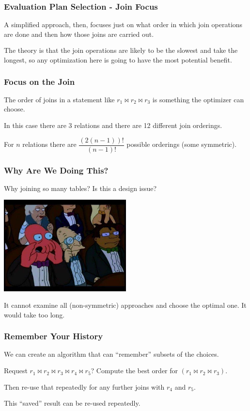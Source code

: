 \begin{frame}
\frametitle{Evaluation Plan Selection - Join Focus}

A simplified approach, then, focuses just on what order in which join operations are done and then how those joins are carried out. 

The theory is that the join operations are likely to be the slowest and take the longest, so any optimization here is going to have the most potential benefit.


\end{frame}

\begin{frame}
\frametitle{Focus on the Join}

The order of joins in a statement like $r_{1} \bowtie r_{2} \bowtie r_{3}$ is something the optimizer can choose. 

In this case there are 3 relations and there are 12 different join orderings. 

For $n$ relations there are $\dfrac{(2(n-1))!}{(n-1)!}$ possible orderings (some symmetric).


\end{frame}


\begin{frame}
\frametitle{Why Are We Doing This?}

Why joining so many tables? Is this a design issue?

\begin{center}
	\includegraphics[width=0.5\textwidth]{images/zoidberg.jpg}
\end{center}


It cannot examine all (non-symmetric) approaches and choose the optimal one. It would take too long.

\end{frame}


\begin{frame}
\frametitle{Remember Your History}

We can create an algorithm that can ``remember'' subsets of the choices. 

Request  $r_{1} \bowtie r_{2} \bowtie r_{3} \bowtie r_{4} \bowtie r_{5}$? Compute the best order for $(r_{1} \bowtie r_{2} \bowtie r_{3})$. 

Then re-use that repeatedly for any further joins with $r_{4}$ and $r_{5}$. 

This ``saved'' result can be re-used repeatedly.

\end{frame}

